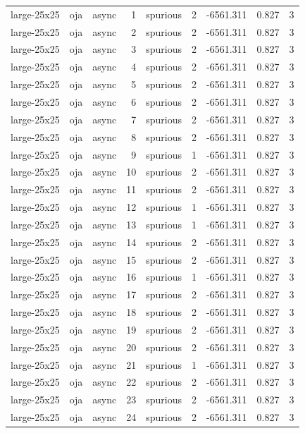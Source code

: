 \begin{tabular}{lllrlrrrr}
large-25x25 & oja & async & 1 & spurious & 2 & -6561.311 & 0.827 & 3 \\
large-25x25 & oja & async & 2 & spurious & 2 & -6561.311 & 0.827 & 3 \\
large-25x25 & oja & async & 3 & spurious & 2 & -6561.311 & 0.827 & 3 \\
large-25x25 & oja & async & 4 & spurious & 2 & -6561.311 & 0.827 & 3 \\
large-25x25 & oja & async & 5 & spurious & 2 & -6561.311 & 0.827 & 3 \\
large-25x25 & oja & async & 6 & spurious & 2 & -6561.311 & 0.827 & 3 \\
large-25x25 & oja & async & 7 & spurious & 2 & -6561.311 & 0.827 & 3 \\
large-25x25 & oja & async & 8 & spurious & 2 & -6561.311 & 0.827 & 3 \\
large-25x25 & oja & async & 9 & spurious & 1 & -6561.311 & 0.827 & 3 \\
large-25x25 & oja & async & 10 & spurious & 2 & -6561.311 & 0.827 & 3 \\
large-25x25 & oja & async & 11 & spurious & 2 & -6561.311 & 0.827 & 3 \\
large-25x25 & oja & async & 12 & spurious & 1 & -6561.311 & 0.827 & 3 \\
large-25x25 & oja & async & 13 & spurious & 1 & -6561.311 & 0.827 & 3 \\
large-25x25 & oja & async & 14 & spurious & 2 & -6561.311 & 0.827 & 3 \\
large-25x25 & oja & async & 15 & spurious & 2 & -6561.311 & 0.827 & 3 \\
large-25x25 & oja & async & 16 & spurious & 1 & -6561.311 & 0.827 & 3 \\
large-25x25 & oja & async & 17 & spurious & 2 & -6561.311 & 0.827 & 3 \\
large-25x25 & oja & async & 18 & spurious & 2 & -6561.311 & 0.827 & 3 \\
large-25x25 & oja & async & 19 & spurious & 2 & -6561.311 & 0.827 & 3 \\
large-25x25 & oja & async & 20 & spurious & 2 & -6561.311 & 0.827 & 3 \\
large-25x25 & oja & async & 21 & spurious & 1 & -6561.311 & 0.827 & 3 \\
large-25x25 & oja & async & 22 & spurious & 2 & -6561.311 & 0.827 & 3 \\
large-25x25 & oja & async & 23 & spurious & 2 & -6561.311 & 0.827 & 3 \\
large-25x25 & oja & async & 24 & spurious & 2 & -6561.311 & 0.827 & 3 \\

\end{tabular}

